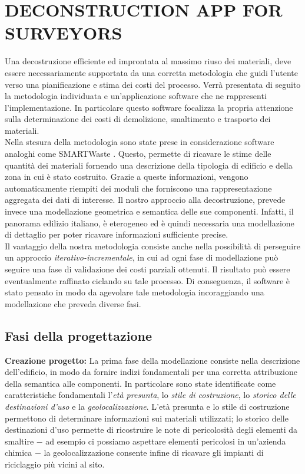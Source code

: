 \section{\uppercase{Deconstruction App for surveyors}}
\label{sec:application}

\noindent Una decostruzione efficiente ed improntata al massimo riuso dei materiali, deve essere necessariamente supportata da una corretta metodologia che guidi l'utente verso una pianificazione e stima dei costi del processo. Verr\`a presentata di seguito la metodologia individuata e un'applicazione software che ne rappresenti l'implementazione. In particolare questo software focalizza la propria attenzione sulla determinazione dei costi di demolizione, smaltimento e trasporto dei materiali.\\

\noindent Nella stesura della metodologia sono state prese in considerazione software analoghi come SMARTWaste \cite{SMARTWaste}. Questo, permette di ricavare le stime delle quantit\`a dei materiali fornendo una descrizione della tipologia di edificio e della zona in cui \`e stato costruito. Grazie a queste informazioni, vengono automaticamente riempiti dei moduli che forniscono una rappresentazione aggregata dei dati di interesse. Il nostro approccio alla decostruzione, prevede invece una modellazione geometrica e semantica delle sue componenti. Infatti, il panorama edilizio italiano, \`e eterogeneo ed \`e quindi necessaria una modellazione di dettaglio per poter ricavare informazioni sufficiente precise.\\

\noindent Il vantaggio della nostra metodologia consiste anche nella possibilit\`a di perseguire un approccio \textit{iterativo-incrementale}, in cui ad ogni fase di modellazione pu\`o seguire una fase di validazione dei costi parziali ottenuti. Il risultato pu\`o essere eventualmente raffinato ciclando su tale processo. Di conseguenza, il software \`e stato pensato in modo da agevolare tale metodologia incoraggiando una modellazione che preveda diverse fasi.\\

\subsection{Fasi della progettazione}

\noindent \textbf{Creazione progetto:} La prima fase della modellazione consiste nella descrizione dell'edificio, in modo da fornire indizi fondamentali per una corretta attribuzione della semantica alle componenti. In particolare sono state identificate come caratteristiche fondamentali l'\textit{et\`a presunta}, lo \textit{stile di costruzione}, lo \textit{storico delle destinazioni d'uso} e la \textit{geolocalizzazione}. L'et\`a presunta e lo stile di costruzione permettono di determinare informazioni sui materiali utilizzati; lo storico delle destinazioni d'uso permette di ricostruire le note di pericolosit\`a degli elementi da smaltire $-$ ad esempio ci possiamo aspettare elementi pericolosi in un'azienda chimica $-$ la geolocalizzazione consente infine di ricavare gli impianti di riciclaggio pi\`u vicini al sito.\\


